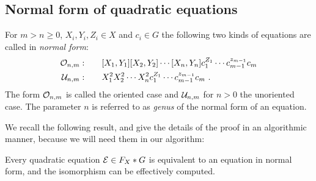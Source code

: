 \documentclass[a4paper,11pt]{amsart}
\begin{document}
\subsection{Normal form of quadratic equations} \label{sec:normal_form}
\begin{defi}
  For $m>n\ge0$, $X_i,Y_i,Z_i \in X$ and $c_i \in G$ the following two kinds of
  equations are called in \emph{normal form}:
 \begin{align}
  \mathcal{O}_{n,m}:\qquad & [X_1,Y_1][X_2,Y_2]\cdots[X_n,Y_n]c_1^{Z_1}\cdots c_{m-1}^{z_{m-1}}c_m  \\
   \mathcal{\mathcal{U}}_{n,m}:\qquad & X_1^2X_2^2\cdots X_n^2 c_1^{Z_1}\cdots c_{m-1}^{z_{m-1}}c_m\ .
 \end{align} 
 The form $\mathcal{O}_{n,m}$ is called the oriented case and $\mathcal{U}_{n,m}$ for
 $n>0$ the unoriented case.  The parameter $n$ is referred to as
 \emph{genus} of the normal form of an equation.
\end{defi}

We recall the following result, and 
give the details of the proof in an algorithmic manner, because we will need them in our algorithm:
\begin{thm} \label{Thm:equationNormalForm}
  Every quadratic equation $\mathcal{E} \in F_X*G$ is equivalent to an equation
  in normal form, and the isomorphism can be effectively computed.
\end{thm}
\end{document}
